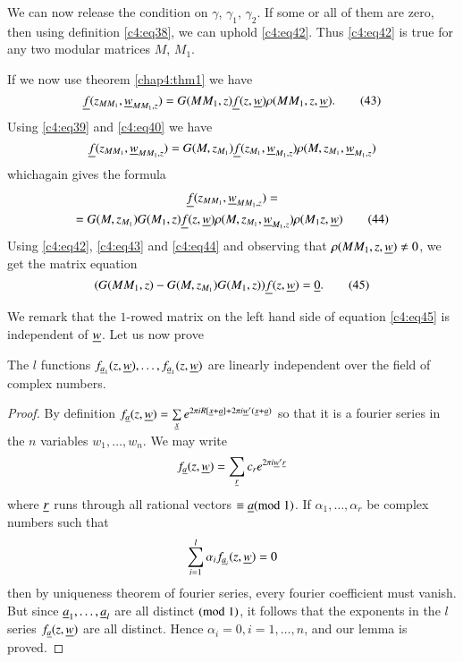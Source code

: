 We can now release the condition on $\gamma$, $\gamma_{1}$,
$\gamma_{2}$. If some or all of them are zero, then using definition
\eqref{c4:eq38}, we can uphold \eqref{c4:eq42}. Thus \eqref{c4:eq42} is true for any
two modular matrices $M$, $M_{1}$.

If we now use theorem \ref{chap4:thm1} we have
\begin{equation*}
\underline{f}(z_{MM_{1}},\underline{w}_{MM_{1},z})=G(MM_{1},z)\underline{f}(z,\underline{w})\rho(MM_{1},z,\underline{w}).\tag{43}\label{c4:eq43}
\end{equation*}
Using \eqref{c4:eq39} and \eqref{c4:eq40} we have
$$
\underline{f}(z_{MM_{1}},\underline{w}_{MM_{1},z})=G(M,z_{M_{1}})\underline{f}(z_{M_{1}},\underline{w}_{M_{1},z})\rho(M,z_{M_{1}},\underline{w}_{M_{1},z}) 
$$
which\pageoriginale again gives the formula
\begin{gather*}
\underline{f}(z_{MM_{1}},\underline{w}_{MM_{1},z})=\\
=G(M,z_{M_{1}})G(M_{1},z)\underline{f}(z,\underline{w})\rho(M,z_{M_{1}},\underline{w}_{M_{1},z})\rho(M_{1}z,\underline{w})\tag{44}\label{c4:eq44}
\end{gather*}
Using \eqref{c4:eq42}, \eqref{c4:eq43} and \eqref{c4:eq44} and observing that
$\rho(MM_{1},z,\underline{w})\neq 0$, we get the matrix equation
\begin{equation*}
(G(MM_{1},z)-G(M,z_{M_{1}})G(M_{1},z))\underline{f}(z,\underline{w})=\underline{0}.\tag{45}\label{c4:eq45}
\end{equation*}

We remark that the $1$-rowed matrix on the left hand side of equation
\eqref{c4:eq45} is independent of $\underline{w}$. Let us now prove

\begin{lem}\label{chap4:lem3}
The $l$ functions
$f_{\underline{a}_{1}}(z,\underline{w}),\ldots,f_{\underline{a}_{1}}(z,\underline{w})$ are
linearly independent over the field of complex numbers.
\end{lem}

\begin{proof}
By definition $f_{\underline{a}}(z,\underline{w})=\sum\limits_{\underline{x}}e^{2\pi
  iR[\underline{x}+\underline{a}]+2\pi i\underline{w}'(\underline{x}+\underline{a})}$ so that it is a\break
fourier series in the $n$ variables $w_{1},\ldots,w_{n}$. We may write
$$
f_{\underline{a}}(z,\underline{w})=\sum_{\underline{r}}c_{r}e^{2\pi i\underline{w}'\underline{r}}
$$
where $\underline{r}$ runs through all rational vectors $\equiv
\underline{a}(\rm{mod} \; 1)$. If $\alpha_{1},\ldots,\alpha_{r}$ be complex numbers
such that
$$
\sum^{l}_{i=1}\alpha_{i}f_{\underline{a}_{i}}(z,\underline{w})=0
$$
then by uniqueness theorem of fourier series, every fourier
coefficient must vanish. But since $\underline{a}_{1},\ldots,\underline{a}_{l}$ are
all distinct $(\rm{mod} \; 1)$, it follows that the exponents in the $l$ series
$f_{\underline{a}}(z,\underline{w})$ are all distinct. Hence
$\alpha_{i}=0,i=1,\ldots,n$, and our lemma is proved.
\end{proof}

